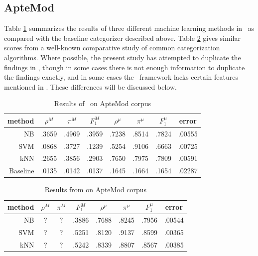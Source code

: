 \subsection{ApteMod}

Table \ref{aptemod-results} summarizes the results of three different
machine learning methods in \aicat\ as compared with the baseline
categorizer described above.  Table \ref{aptemod-yang} gives similar
scores from a well-known comparative study of common categorization
algorithms. \cite{yang:99} Where possible, the present study has
attempted to duplicate the findings in \cite{yang:99}, though in some
cases there is not enough information to duplicate the findings
exactly, and in some cases the \aicat\ framework lacks certain
features mentioned in \cite{yang:99}.  These differences will be
discussed below.

\begin{table}
\begin{center}
\begin{tabular}{|r c c c c c c c|}
\hline
method    & $\rho^M$ & $\pi^M$ & $F_1^M$ & $\rho^\mu$ & $\pi^\mu$ & $F_1^\mu$ &   error \\
\hline
NB        &   .3659  &  .4969  &  .3959  &  .7238     &  .8514    &  .7824    &  .00555 \\
SVM       &   .0868  &  .3727  &  .1239  &  .5254     &  .9106    &  .6663    &  .00725 \\
kNN       &   .2655  &  .3856  &  .2903  &  .7650     &  .7975    &  .7809    &  .00591 \\
Baseline  &   .0135  &  .0142  &  .0137  &  .1645     &  .1664    &  .1654    &  .02287 \\
\hline
\end{tabular}
\end{center}
\caption{Results of \aicat\ on ApteMod corpus}
\label{aptemod-results}
\end{table}

\begin{table}
\begin{center}
\begin{tabular}{|r c c c c c c c|}
\hline
method & $\rho^M$ & $\pi^M$ & $F_1^M$ & $\rho^\mu$ & $\pi^\mu$ & $F_1^\mu$ & error \\
\hline
NB  & ? & ? & .3886 & .7688 & .8245 & .7956 & .00544 \\
SVM & ? & ? & .5251 & .8120 & .9137 & .8599 & .00365 \\
kNN & ? & ? & .5242 & .8339 & .8807 & .8567 & .00385 \\
\hline
\end{tabular}
\end{center}
\caption{Results from \cite{yang:99} on ApteMod corpus}
\label{aptemod-yang}
\end{table}

